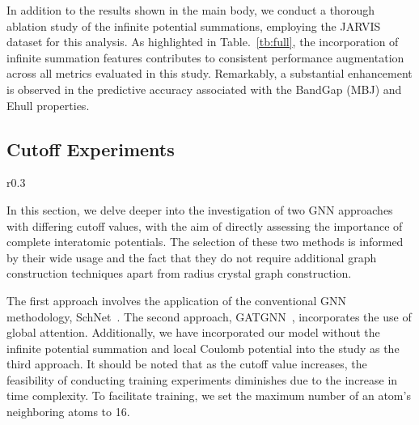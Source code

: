 \documentclass[nohyperref]{article}
\theoremstyle{plain}
\theoremstyle{definition}
\theoremstyle{remark}
\begin{document}
In addition to the results shown in the main body, we conduct a thorough ablation study of the infinite potential summations, employing the JARVIS dataset for this analysis. As highlighted in Table.~\ref{tb:full}, the incorporation of infinite summation features contributes to consistent performance augmentation across all metrics evaluated in this study. Remarkably, a substantial enhancement is observed in the predictive accuracy associated with the BandGap (MBJ) and Ehull properties.

\subsection{Cutoff Experiments}
\label{sec:additional}

\begin{wraptable}[12]{r}{0.3\textwidth}
\vspace{-25 pt}
\begin{center}
\caption{Experiments with varied cutoffs on JARVIS formation energy and dataset preprocessing time.}\vspace{-0.2cm}
\label{tb:additional}
\end{center}
\end{wraptable} In this section, we delve deeper into the investigation of two GNN approaches with differing cutoff values, with the aim of directly assessing the importance of complete interatomic potentials. The selection of these two methods is informed by their wide usage and the fact that they do not require additional graph construction techniques apart from radius crystal graph construction.

The first approach involves the application of the conventional GNN methodology, SchNet~\citep{schutt2017schnet}. The second approach, GATGNN~\citep{GATGNN}, incorporates the use of global attention. Additionally, we have incorporated our model without the infinite potential summation and local Coulomb potential into the study as the third approach. It should be noted that as the cutoff value increases, the feasibility of conducting training experiments diminishes due to the increase in time complexity. To facilitate training, we set the maximum number of an atom's neighboring atoms to 16.
\end{document}

